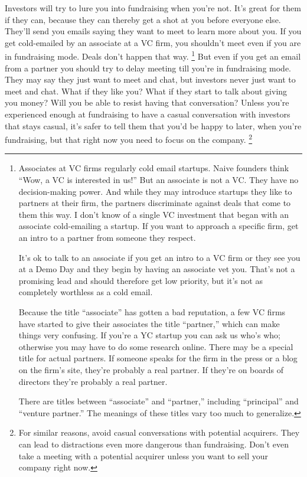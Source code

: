 Investors will try to lure you into fundraising when you're not. It's
great for them if they can, because they can thereby get a shot at you
before everyone else. They'll send you emails saying they want to meet
to learn more about you. If you get cold-emailed by an associate at a VC
firm, you shouldn't meet even if you are in fundraising mode. Deals
don't happen that way. \footnote{Associates at VC firms regularly cold email startups. Naive
founders think ``Wow, a VC is interested in us!'' But an associate is
not a VC. They have no decision-making power. And while they may
introduce startups they like to partners at their firm, the partners
discriminate against deals that come to them this way. I don't know of a
single VC investment that began with an associate cold-emailing a
startup. If you want to approach a specific firm, get an intro to a
partner from someone they respect.

It's ok to talk to an associate if you get an intro to a VC firm or they
see you at a Demo Day and they begin by having an associate vet you.
That's not a promising lead and should therefore get low priority, but
it's not as completely worthless as a cold email.

Because the title ``associate'' has gotten a bad reputation, a few VC
firms have started to give their associates the title ``partner,'' which
can make things very confusing. If you're a YC startup you can ask us
who's who; otherwise you may have to do some research online. There may
be a special title for actual partners. If someone speaks for the firm
in the press or a blog on the firm's site, they're probably a real
partner. If they're on boards of directors they're probably a real
partner.

There are titles between ``associate'' and ``partner,'' including
``principal'' and ``venture partner.'' The meanings of these titles vary
too much to generalize.} But even if you get an
email from a partner you should try to delay meeting till you're in
fundraising mode. They may say they just want to meet and chat, but
investors never just want to meet and chat. What if they like you? What
if they start to talk about giving you money? Will you be able to resist
having that conversation? Unless you're experienced enough at
fundraising to have a casual conversation with investors that stays
casual, it's safer to tell them that you'd be happy to later, when
you're fundraising, but that right now you need to focus on the company.
\footnote{For similar reasons, avoid casual conversations with potential
acquirers. They can lead to distractions even more dangerous than
fundraising. Don't even take a meeting with a potential acquirer unless
you want to sell your company right now.}

